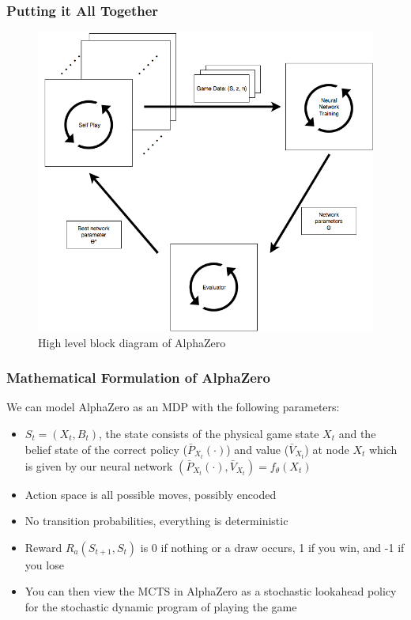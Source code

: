 \documentclass{beamer}
\begin{document}


\begin{frame}
  \frametitle{Putting it All Together}

  \begin{figure}
    \includegraphics[width=0.61\linewidth]{./images/alphazero.png}
    \caption{High level block diagram of AlphaZero}
  \end{figure}
\end{frame}



\begin{frame}
  \frametitle{Mathematical Formulation of AlphaZero}

  We can model AlphaZero as an MDP with the following parameters:
  \begin{itemize}
    \item $S_t = (X_t, B_t)$, the state consists of the physical game state $X_t$ and the belief state of the correct policy ($\bar{P}_{X_t}(\cdot)$) and value ($\bar{V}_{X_t}$) at node $X_t$ which is given by our neural network $(\bar{P}_{X_t}(\cdot),\bar{V}_{X_t}) = f_\theta(X_t)$
    \item Action space is all possible moves, possibly encoded
    \item No transition probabilities, everything is deterministic
    \item Reward $R_a(S_{t+1}, S_t)$ is 0 if nothing or a draw occurs, 1 if you win, and -1 if you lose
    \item You can then view the MCTS in AlphaZero as a stochastic lookahead policy for the stochastic dynamic program of playing the game
  \end{itemize}
\end{frame}
\end{document}
